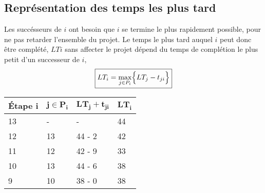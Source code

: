 \documentclass{report}
\begin{document}
\begin{multicols*}{2}
\begin{center}
{
    }
\end{center}



\subsection{Représentation des temps les plus tard}
Les succésseurs de $i$ ont besoin que $i$ se termine 
le plus rapidement possible, pour ne pas retarder 
l'ensemble du projet. Le temps le plus tard auquel $i$ 
peut donc être complété, $LTi$ 
sans affecter le projet dépend du temps de complétion 
le plus petit d'un successeur de $i$,
\begin{align*}
    \boxed{
        LT_i = \max_{j \in P_i}\Bigl\{ LT_j - t_{ji} \Bigr\}
    }
\end{align*}

\begin{table}[H]
    \begin{center}
        \renewcommand{\arraystretch}{2}
        \selectfont
        \footnotesize
        \begin{tabular}{|l|l|l|l|}
            \hline
            \textbf{Étape} $\boldsymbol{i}$ & $\boldsymbol{j \in P_i}$ 
                                            & $\boldsymbol{LT_j + t_{ji}}$
                                            & $\boldsymbol{LT_i}$   
                                            \\
                                            \hline
                                            \arrayrulecolor{black}
            13 & - & - & 44
            \\
            \hline
            12 & 13 & 44 - 2 & 42  
            \\
            \hline
            11 & 12 & 42 - 9 & 33
            \\ 
            \hline            
            10 & 13 & 44 - 6 & 38 
            \\ 
            \hline            

            9  & 10 & 38 - 0 & 38
            \\ 
            \hline            


\end{tabular}
\end{center}
\end{table}
\end{multicols*}
\end{document}
